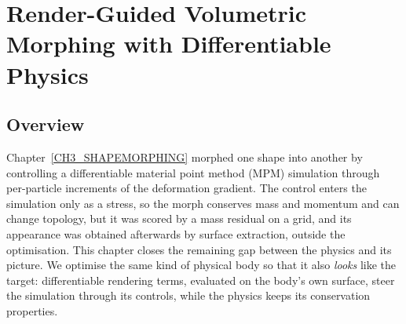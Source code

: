 
\clearpage %
\chapter{Render-Guided Volumetric Morphing with Differentiable Physics}\label{CH4_PhysMorphGS}
\usetikzlibrary{positioning,arrows.meta,fit,calc}

\section{Overview}
\label{sec:overview}

Chapter~\ref{CH3_SHAPEMORPHING} morphed one shape into another by controlling a differentiable material point
method (MPM) simulation through per-particle increments of the deformation gradient. The control enters the
simulation only as a stress, so the morph conserves mass and momentum and can change topology, but it was scored
by a mass residual on a grid, and its appearance was obtained afterwards by surface extraction, outside the
optimisation. This chapter closes the remaining gap
between the physics and its picture. We optimise the same kind of physical body so that it also \emph{looks}
like the target: differentiable rendering terms, evaluated on the body's own surface, steer the simulation through
its controls, while the physics keeps its conservation properties.

